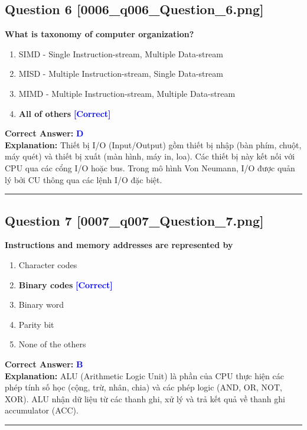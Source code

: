 \documentclass[11pt,a4paper]{article}
\begin{document}
\begin{minipage}{\textwidth}
\subsection*{Question 6 \quad \footnotesize{[0006\_q006\_Question\_6.png]}}
\noindent \textbf{What is taxonomy of computer organization?}

\begin{enumerate}[label=\Alph*.]
    \item SIMD - Single Instruction-stream, Multiple Data-stream
    \item MISD - Multiple Instruction-stream, Single Data-stream
    \item MIMD - Multiple Instruction-stream, Multiple Data-stream
    \item \textbf{All of others} \hfill \textcolor{blue}{\textbf{[Correct]}}
\end{enumerate}

\noindent \textbf{Correct Answer:} \textcolor{blue}{\textbf{D}} \\[2pt]
\noindent \textbf{Explanation:} Thiết bị I/O (Input/Output) gồm thiết bị nhập (bàn phím, chuột, máy quét) và thiết bị xuất (màn hình, máy in, loa). Các thiết bị này kết nối với CPU qua các cổng I/O hoặc bus. Trong mô hình Von Neumann, I/O được quản lý bởi CU thông qua các lệnh I/O đặc biệt.

\par\vspace{0.3cm}
\hrule
\vspace{0.3cm}
\end{minipage}

\begin{minipage}{\textwidth}
\subsection*{Question 7 \quad \footnotesize{[0007\_q007\_Question\_7.png]}}
\noindent \textbf{Instructions and memory addresses are represented by}

\begin{enumerate}[label=\Alph*.]
    \item Character codes
    \item \textbf{Binary codes} \hfill \textcolor{blue}{\textbf{[Correct]}}
    \item Binary word
    \item Parity bit
    \item None of the others
\end{enumerate}

\noindent \textbf{Correct Answer:} \textcolor{blue}{\textbf{B}} \\[2pt]
\noindent \textbf{Explanation:} ALU (Arithmetic Logic Unit) là phần của CPU thực hiện các phép tính số học (cộng, trừ, nhân, chia) và các phép logic (AND, OR, NOT, XOR). ALU nhận dữ liệu từ các thanh ghi, xử lý và trả kết quả về thanh ghi accumulator (ACC).

\par\vspace{0.3cm}
\hrule
\vspace{0.3cm}
\end{minipage}
\end{document}
